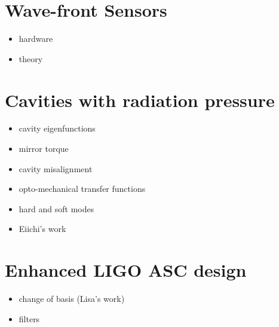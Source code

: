 \section{Wave-front Sensors}
\begin{itemize}
\item hardware
\item theory
\end{itemize}

\section{Cavities with radiation pressure}
\begin{itemize}
\item cavity eigenfunctions
\item mirror torque
\item cavity misalignment
\item opto-mechanical transfer functions
\item hard and soft modes
\item Eiichi's work
\end{itemize}

\section{Enhanced LIGO ASC design}
\begin{itemize}
\item change of basis (Lisa's work)
\item filters
\end{itemize}


